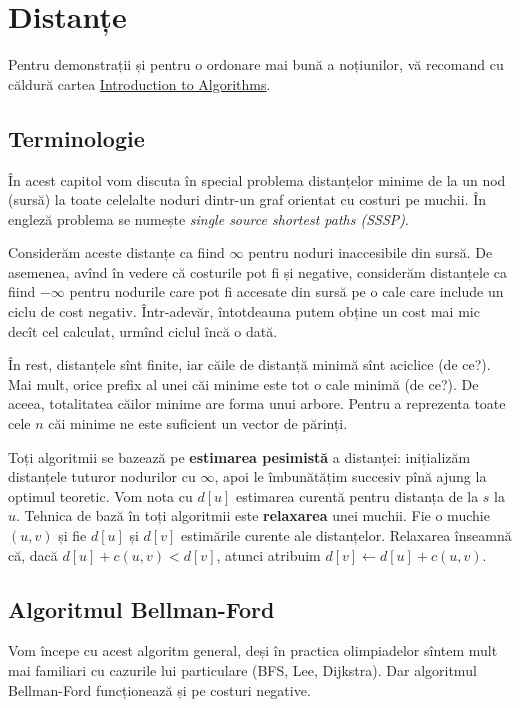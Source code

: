 \documentclass[../main.tex]{subfiles}
\begin{document}
\chapter{Distanțe}

Pentru demonstrații și pentru o ordonare mai bună a noțiunilor, vă recomand cu căldură cartea \href{http://mitpress.mit.edu/algorithms}{Introduction to Algorithms}.

\section{Terminologie}

În acest capitol vom discuta în special problema distanțelor minime de la un nod (sursă) la toate celelalte noduri dintr-un graf orientat cu costuri pe muchii. În engleză problema se numește \textit{single source shortest paths (SSSP)}.

Considerăm aceste distanțe ca fiind $\infty$ pentru noduri inaccesibile din sursă. De asemenea, avînd în vedere că costurile pot fi și negative, considerăm distanțele ca fiind $-\infty$ pentru nodurile care pot fi accesate din sursă pe o cale care include un ciclu de cost negativ. Într-adevăr, întotdeauna putem obține un cost mai mic decît cel calculat, urmînd ciclul încă o dată.

În rest, distanțele sînt finite, iar căile de distanță minimă sînt aciclice (de ce?). Mai mult, orice prefix al unei căi minime este tot o cale minimă (de ce?). De aceea, totalitatea căilor minime are forma unui arbore. Pentru a reprezenta toate cele $n$ căi minime ne este suficient un vector de părinți.

Toți algoritmii se bazează pe \textbf{estimarea pesimistă} a distanței: inițializăm distanțele tuturor nodurilor cu $\infty$, apoi le îmbunătățim succesiv pînă ajung la optimul teoretic. Vom nota cu $d[u]$ estimarea curentă pentru distanța de la $s$ la $u$. Tehnica de bază în toți algoritmii este \textbf{relaxarea} unei muchii. Fie o muchie $(u,v)$ și fie $d[u]$ și $d[v]$ estimările curente ale distanțelor. Relaxarea înseamnă că, dacă $d[u] + c(u,v) < d[v]$, atunci atribuim $d[v] \gets d[u] + c(u,v)$.

\section{Algoritmul Bellman-Ford}
\label{sec:bellman-ford}

Vom începe cu acest algoritm general, deși în practica olimpiadelor sîntem mult mai familiari cu cazurile lui particulare (BFS, Lee, Dijkstra). Dar algoritmul Bellman-Ford funcționează și pe costuri negative.
\end{document}

